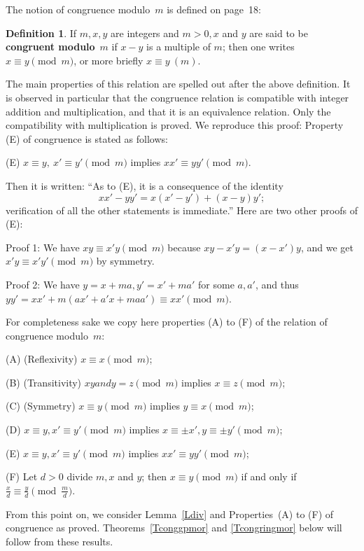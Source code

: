 \documentclass[12pt,letterpaper]{article}
\theoremstyle{definition}
\newtheorem{defn}[thm]{Definition}
\begin{document}
The notion of congruence modulo~$m$ is defined on page~18: 

\begin{defn}\label{Dcong}
If $m,x,y$ are integers and $m>0, x$ and $y$ are said to be \textbf{congruent modulo}~$m$  if $x-y$ is a multiple of $m$; then one writes $x\equiv y \pmod m$, or more briefly $x\equiv y\ (m)$. 
\end{defn}

The main properties of this relation are spelled out after the above definition. It is observed in particular that the congruence relation is compatible with integer addition and multiplication, and that it is an equivalence relation. Only the compatibility with multiplication is proved. We reproduce this proof: Property (E) of congruence is stated as follows: 

(E) $x\equiv y,\ x'\equiv y' \pmod m$ implies $xx'\equiv yy' \pmod m$. 

Then it is written: ``As to (E), it is a consequence of the identity 
$$
xx'-yy'=x(x'-y')+(x-y)y';
$$ 
verification of all the other statements is immediate.'' Here are two other proofs of (E): 

Proof 1: We have $xy\equiv x'y \pmod m$ because $xy-x'y=(x-x')y$, and we get $x'y\equiv x'y' \pmod m$ by symmetry. 

Proof 2: We have $y=x+ma, y'=x'+ma'$ for some $a,a'$, and thus $yy'=xx'+m(ax'+a'x+maa')\equiv xx' \pmod m$. 

For completeness sake we copy here properties (A) to (F) of the relation of congruence modulo~$m$:

(A) (Reflexivity) $x\equiv x \pmod m$; 

(B) (Transitivity) $x y and y=z \pmod m$ implies $x\equiv z \pmod m$; 

(C) (Symmetry) $x\equiv y \pmod m$ implies $y\equiv x \pmod m$; 

(D) $x\equiv y, x'\equiv y' \pmod m$ implies $x\equiv\pm x', y\equiv\pm y' \pmod m$; 

(E) $x\equiv y, x'\equiv y' \pmod m$ implies $xx'\equiv yy' \pmod m$; 

(F) Let $d>0$ divide $m,x$ and $y$; then $x\equiv y \pmod m$ if and only if $\frac{x}{d}\equiv\frac{y}{d} \pmod{\frac{m}{d}}$.

From this point on, we consider Lemma~\ref{Ldiv} and Properties~(A) to (F) of congruence as proved. Theorems~\ref{Tconggpmor} and \ref{Tcongringmor} below will follow from these results. 
\end{document}
